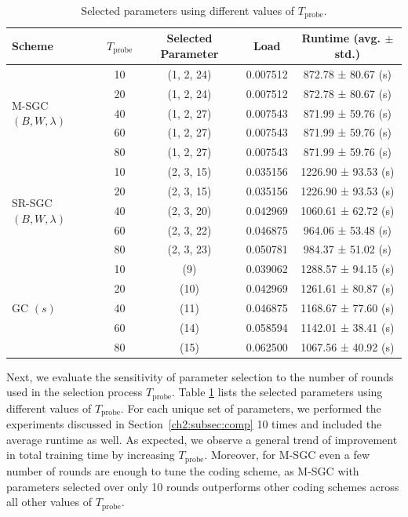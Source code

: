 \begin{table}[ht]
\centering
\caption{Selected parameters using different values of $T_\text{probe}$.} \label{ch2:table:tprobe}
\renewcommand{\arraystretch}{1.3}
\begin{tabular}{lcccc}
    \toprule
    \textbf{Scheme} & \textbf{$T_\text{probe}$} & \textbf{Selected Parameter} & \textbf{Load} & \textbf{Runtime (avg. $\pm$ std.)} \\
    \midrule
    \multirow{5}{*}{M-SGC $(B, W, \lambda)$} & 10 & (1, 2, 24) & 0.007512 & 872.78 ± 80.67 (s) \\
     & 20 & (1, 2, 24) & 0.007512 & 872.78 ± 80.67 (s) \\
     & 40 & (1, 2, 27) & 0.007543 & 871.99 ± 59.76 (s) \\
     & 60 & (1, 2, 27) & 0.007543 & 871.99 ± 59.76 (s) \\
     & 80 & (1, 2, 27) & 0.007543 & 871.99 ± 59.76 (s) \\
    \hline 
    \multirow{5}{*}{SR-SGC $(B, W, \lambda)$} 
    & 10 & (2, 3, 15) & 0.035156 & 1226.90 ± 93.53 (s) \\
    & 20 & (2, 3, 15) & 0.035156 & 1226.90 ± 93.53 (s) \\
    & 40 & (2, 3, 20) & 0.042969 & 1060.61 ± 62.72 (s) \\
    & 60 & (2, 3, 22) & 0.046875 & 964.06 ± 53.48 (s) \\
    & 80 & (2, 3, 23) & 0.050781 & 984.37 ± 51.02 (s) \\
    \hline 
     \multirow{5}{*}{GC $(s)$} 
     & 10 & (9) & 0.039062 & 1288.57 ± 94.15 (s) \\
     & 20 & (10) & 0.042969 & 1261.61 ± 80.87 (s) \\
     & 40 & (11) & 0.046875 & 1168.67 ± 77.60 (s) \\
     & 60 & (14) & 0.058594 & 1142.01 ± 38.41 (s) \\
     & 80 & (15) & 0.062500 & 1067.56 ± 40.92 (s) \\
     \bottomrule
\end{tabular}
\end{table}

\FloatBarrier

Next, we evaluate the sensitivity of parameter selection to the number of rounds used in the selection process $ T_\text{probe}$. Table \ref{ch2:table:tprobe} lists the selected parameters using different values of $T_\text{probe}$. For each unique set of parameters, we performed the experiments discussed in Section~\ref{ch2:subsec:comp} 10 times and included the average runtime as well. As expected, we observe a general trend of improvement in total training time by increasing $T_\text{probe}$. Moreover, for M-SGC even a few number of rounds are enough to tune the coding scheme, as M-SGC with parameters selected over only 10 rounds outperforms other coding schemes across all other values of $T_\text{probe}$.


